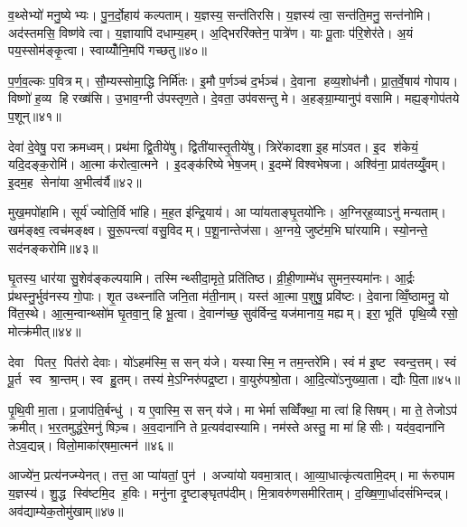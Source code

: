 व॒थ्सेभ्यो॑ मनु॒ष्येभ्यः। पु॒न॒र्दो॒हाय॑ कल्पताम्। य॒ज्ञस्य॒ सन्त॑तिरसि। य॒ज्ञस्य॑ त्वा॒ सन्त॑ति॒मनु॒ सन्त॑नोमि। अद॑स्तमसि॒ विष्ण॑वे त्वा। य॒ज्ञायापि॑ दधाम्य॒हम्। अ॒द्भिररि॑क्तेन॒ पात्रे॑ण। याः पू॒ताः प॑रि॒शेर॑ते। अ॒यं पय॒स्सोम॑ङ्कृ॒त्वा। स्वाय्योँनि॒मपि॑ गच्छतु॥४०॥

प॒र्ण॒व॒ल्कः प॒वित्रम्। सौ॒म्यस्सोमा॒द्धि निर्मि॑तः। इ॒मौ प॒र्णञ्च॑ द॒र्भञ्च॑। दे॒वाना हव्य॒शोध॑नौ। प्रा॒त॒र्वे॒षाय॑ गोपाय। विष्णो॑ ह॒व्य हि रख्ष॑सि। उ॒भाव॒ग्नी उ॑पस्तृण॒ते। दे॒वता॒ उप॑वसन्तु मे। अ॒हङ्ग्रा॒म्यानुप॑ वसामि। मह्य॒ङ्गोप॑तये प॒शून्॥४१॥\anuvakamend[आभृ॑त इ॒मङ्गृ॑ह्णामि॒ पूर्व॒स्ताः पूर्व॒ परि॑गृह्णामि सभापा॒ला इन्द्र॑ज्येष्ठेभ्य॒ आदि॑त्य व्रतपते सुसं॒भृता॑ मे स॒ह पु॑नातु गहि नो वि॒श्वरू॑पा दधातु॒ पुन॑र्गच्छतु प॒शून् (याःपु॒रस्ता॑दि॒मामूर्ज॑मि॒ह प्र॒जा इ॒ह प॒शवो॒ऽयं पि॑तृ॒णाम॒ग्निः। )]

देवा॑ दे॒वेषु॒ पराक्रमध्वम्। प्रथ॑मा द्वि॒तीये॑षु। द्विती॑यास्तृ॒तीये॑षु। त्रिरे॑कादशा इ॒ह मा॑ऽवत। इ॒द श॑केयं॒ यदि॒दङ्क॒रोमि॑। आ॒त्मा क॑रोत्वा॒त्मने। इ॒दङ्क॑रिष्ये भेष॒जम्। इ॒दम्मे॑ विश्वभेषजा। अश्वि॑ना॒ प्राव॑तय्युँ॒वम्। इ॒दम॒ह सेना॑या अ॒भीत्व॑र्यै॥४२॥

मुख॒मपो॑हामि। सूर्य॑ ज्योति॒र्वि भा॑हि। म॒ह॒त इ॑न्द्रि॒याय॑। आ प्या॑यताङ्घृ॒तयो॑निः। अ॒ग्निर्‌ह॒व्याऽनु॑ मन्यताम्। खम॑ङ्क्ष्व॒ त्वच॑मङ्क्ष्व। सु॒रू॒पन्त्वा॑ वसु॒विदम्। प॒शू॒नान्तेज॑सा। अ॒ग्नये॒ जुष्ट॑म॒भि घा॑रयामि। स्यो॒नन्ते॒ सद॑नङ्करोमि॥४३॥

घृ॒तस्य॒ धार॑या सु॒शेव॑ङ्कल्पयामि। तस्मिन्थ्सीदा॒मृते॒ प्रति॑तिष्ठ। व्री॒ही॒णाम्मे॑ध सुमन॒स्यमा॑नः। आ॒र्द्रः प्र॑थस्नु॒र्भुव॑नस्य गो॒पाः। शृ॒त उथ्स्ना॑ति जनि॒ता म॑ती॒नाम्। यस्त॑ आ॒त्मा प॒शुषु॒ प्रवि॑ष्टः। दे॒वानाव्विँ॒ष्ठामनु॒ यो वि॑त॒स्थे। आ॒त्म॒न्वान्थ्सो॑म घृ॒तवा॒न्॒ हि भू॒त्वा। दे॒वान्ग॑च्छ॒ सुव॑र्विन्द॒ यज॑मानाय॒ मह्यम्। इरा॒ भूति॑ पृथि॒व्यै रसो॒ मोत्क्र॑मीत्॥४४॥

देवा पितर॒ पित॑रो देवाः। यो॑ऽहम॑स्मि॒ स सन् य॑जे। यस्यास्मि॒ न तम॒न्तरे॑मि। स्वं म॑ इ॒ष्ट स्वन्द॒त्तम्। स्वं पू॒र्त स्व श्रा॒न्तम्। स्व हु॒तम्। तस्य॑ मे॒ऽग्निरु॑पद्र॒ष्टा। वा॒युरु॑पश्रो॒ता। आ॒दि॒त्यो॑ऽनुख्या॒ता। द्यौः पि॒ता॥४५॥

पृ॒थि॒वी मा॒ता। प्र॒जाप॑ति॒र्बन्धु॑। य ए॒वास्मि॒ स सन् य॑जे। मा भेर्मा सव्विँ॑क्था॒ मा त्वा॑ हिसिषम्। मा ते॒ तेजोऽप॑ क्रमीत्। भ॒र॒तमुद्ध॑रे॒मनु॑ षिञ़्च। अ॒व॒दाना॑नि ते प्र॒त्यव॑दास्यामि। नम॑स्ते अस्तु॒ मा मा॑ हिसीः। यद॑व॒दाना॑नि तेऽव॒द्यन्न्। विलो॒माका॑र्‌षमा॒त्मन॑॥४६॥

आज्ये॑न॒ प्रत्य॑नज्म्येनत्। तत्त॒ आ प्या॑यतां॒ पुन॑। अज्या॑यो यवमा॒त्रात्। आ॒व्या॒धात्कृ॑त्यतामि॒दम्। मा रू॑रुपाम य॒ज्ञस्य॑। शु॒द्ध स्वि॑ष्टमि॒द ह॒विः। मनु॑ना दृ॒ष्टाङ्घृतप॑दीम्। मि॒त्रावरु॑णसमीरिताम्। द॒ख्षि॒णा॒र्धादसं॑भिन्दन्न्। अव॑द्याम्येक॒तोमु॑खाम्॥४७॥

